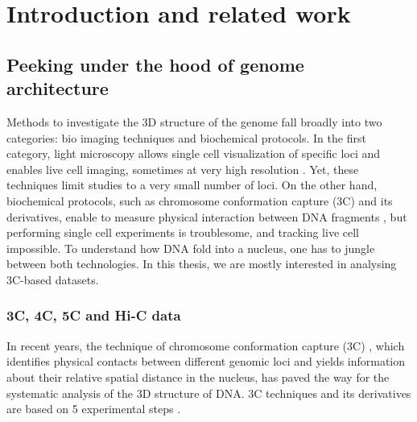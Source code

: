

\chapter{Introduction and related work}

\graphicspath{{1_introduction/}}

\begin{abstract}{Résumé}

\end{abstract}

\begin{abstract}{AbspropertyWe aim in this chapter at providing some background on biological and
mathematical concepts present in this thesis.

\end{abstract}


\section{Peeking under the hood of genome architecture}

Methods to investigate the 3D structure of the genome fall broadly into two
categories: bio imaging techniques and biochemical protocols. In the first
category, light microscopy allows single cell visualization of specific loci
and enables live cell imaging, sometimes at very high resolution
\citep{cremer:chromosome-2010}. Yet, these techniques limit studies to a very
small number of loci. On the other hand, biochemical protocols, such as
chromosome conformation capture (3C) and its derivatives, enable to measure
physical interaction between DNA fragments \citep{dekker:capturing}, but
performing single cell experiments is troublesome, and tracking live cell
impossible. To understand how DNA fold into a nucleus, one has to jungle
between both technologies. In this thesis, we are mostly interested in
analysing 3C-based datasets.

\subsection{3C, 4C, 5C and Hi-C data}

In recent years, the technique of chromosome conformation capture (3C)
\citep{dekker:capturing}, which identifies physical contacts between different
genomic loci and yields information about their relative spatial distance in
the nucleus, has paved the way for the systematic analysis of the 3D structure
of DNA. 3C techniques and its derivatives are based on 5 experimental steps
\citep{lieberman-aiden:comprehensive, kalhor:genome}.

